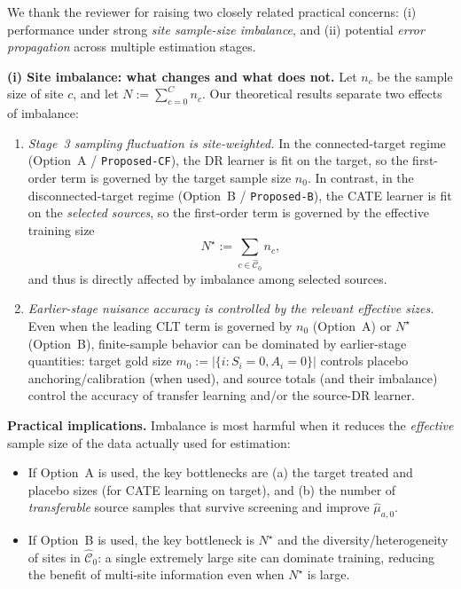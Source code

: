 {\color{blue}
We thank the reviewer for raising two closely related practical concerns: (i) performance under strong \emph{site sample-size imbalance}, and (ii) potential \emph{error propagation} across multiple estimation stages.

\medskip
\noindent\textbf{(i) Site imbalance: what changes and what does not.}
Let $n_c$ be the sample size of site $c$, and let $N:=\sum_{c=0}^C n_c$.
Our theoretical results separate two effects of imbalance:

\begin{enumerate}[leftmargin=*]
\item \emph{Stage~3 sampling fluctuation is site-weighted.}
In the connected-target regime (Option~A / \texttt{Proposed-CF}), the DR learner is fit on the target, so the first-order term is governed by the target sample size $n_0$.
In contrast, in the disconnected-target regime (Option~B / \texttt{Proposed-B}), the CATE learner is fit on the \emph{selected sources}, so the first-order term is governed by the effective training size
\[
N^\star := \sum_{c\in\widehat{\mathcal{C}}_0} n_c,
\]
and thus is directly affected by imbalance among selected sources.

\item \emph{Earlier-stage nuisance accuracy is controlled by the relevant effective sizes.}
Even when the leading CLT term is governed by $n_0$ (Option~A) or $N^\star$ (Option~B), finite-sample behavior can be dominated by earlier-stage quantities:
target gold size $m_0:=|\{i:S_i=0,A_i=0\}|$ controls placebo anchoring/calibration (when used),
and source totals (and their imbalance) control the accuracy of transfer learning and/or the source-DR learner.
\end{enumerate}

\noindent
\textbf{Practical implications.}
Imbalance is most harmful when it reduces the \emph{effective} sample size of the data actually used for estimation:
\begin{itemize}
\item If Option~A is used, the key bottlenecks are (a) the target treated and placebo sizes (for CATE learning on target), and (b) the number of \emph{transferable} source samples that survive screening and improve $\widehat\mu_{a,0}$.
\item If Option~B is used, the key bottleneck is $N^\star$ and the diversity/heterogeneity of sites in $\widehat{\mathcal{C}}_0$: a single extremely large site can dominate training, reducing the benefit of multi-site information even when $N^\star$ is large.
\end{itemize}

}
